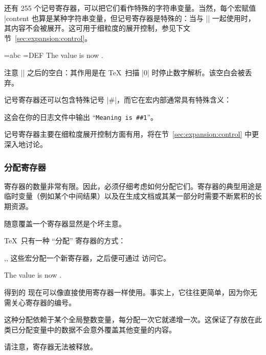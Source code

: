 \documentclass[a4paper,doc2]{ltxdoc}
\begin{document}
\begin{command}{\toks{}}
\label{cmd:toks}
	还有 255 个记号寄存器，可以把它们看作特殊的字符串变量。当然，每个宏赋值 |\def\macro|\marg{content} 也算是某种字符串变量，但记号寄存器是特殊的：当与 |\the\toks| 一起使用时，其内容不会被展开。这可用于细粒度的展开控制，参见下文节~\ref{sec:expansion:control}。

\begin{codeexample}[]
={abc}%
={DEF}%
The value is now \the{} \the{}.
\end{codeexample}
	注意 |\the{}| 之后的空白：其作用是在 \TeX\ 扫描 |0| 时停止数字解析。该空白会被丢弃。

	记号寄存器还可以包含特殊记号 |#|，而它在宏内部通常具有特殊含义：
	这会在你的日志文件中输出 ``\texttt{Meaning is \#\#1}''。

	记号寄存器主要在细粒度展开控制方面有用，将在节~\ref{sec:expansion:control} 中更深入地讨论。
\end{command}

\subsubsection{分配寄存器}
寄存器的数量非常有限。因此，必须仔细考虑如何分配它们。寄存器的典型用途是临时变量（例如某个中间结果）以及在生成文档或其某一部分时需要不断累积的长期资源。

随意覆盖一个寄存器显然是个坏主意。

\TeX\ 只有一种 ``分配'' 寄存器的方式：
\begin{commandlist}{\newdimen{},\newcount{},\newtoks{}}
	这些宏分配一个新寄存器，之后便可通过  访问它。
\begin{codeexample}[]
\newdimen\variable

\variable=42pt

The value is now \the\variable.
\end{codeexample}

	得到的  现在可以像直接使用寄存器一样使用。事实上，它往往更简单，因为你无需关心寄存器的编号。

	这种分配依赖于某个全局整数变量，每分配一次它就递增一次。这保证了存放在此类已分配变量中的数据不会意外覆盖其他变量的内容。

	请注意，寄存器无法被释放。
\end{commandlist}
\end{document}
